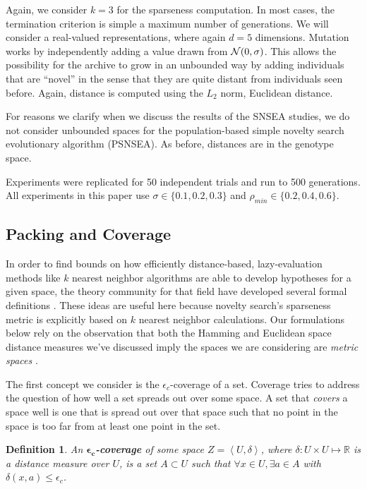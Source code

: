 \documentclass[twoside]{article}
\newtheorem{definition}{Definition}
\newcommand{\IR}{\mathbb{R}}
\begin{document}
Again, we consider $k=3$ for the sparseness computation.  In most cases, the termination criterion is simple a maximum number of generations.  We will consider a real-valued representations, where again $d=5$ dimensions.  Mutation works by independently adding a value drawn from ${\cal N}(0,\sigma)$.  This allows the possibility for the archive to grow in an unbounded way by adding individuals that are ``novel'' in the sense that they are quite distant from individuals seen before.  Again, distance is computed using the $L_2$ norm, Euclidean distance.

For reasons we clarify when we discuss the results of the SNSEA studies, we do not consider unbounded spaces for the population-based simple novelty search evolutionary algorithm (PSNSEA).  As before, distances are in the genotype space.

Experiments were replicated for 50 independent trials and run to 500 generations. All experiments in this paper use $\sigma\in\{0.1,0.2,0.3\}$ and $\rho_{min} \in \{0.2,0.4,0.6\}$. 


\subsection{Packing and Coverage}
\label{subsec:knn}

In order to find bounds on how efficiently distance-based, lazy-evaluation methods like $k$ nearest neighbor algorithms are able to develop hypotheses for a given space, the theory community for that field have developed several formal definitions \citep{Clarkson1999dcg}. These ideas are useful here because novelty search's sparseness metric is explicitly based on $k$ nearest neighbor calculations.  Our formulations below rely on the observation that both the Hamming and Euclidean space distance measures we've discussed imply the spaces we are considering are \emph{metric spaces} \citep{Bryant1985}.

The first concept we consider is the $\epsilon_c$-coverage of a set.  Coverage tries to address the question of how well a set spreads out over some space.  A set that \emph{covers} a space well is one that is spread out over that space such that no point in the space is too far from at least one point in the set.

\begin{definition}
An $\boldsymbol{\epsilon_c}$\textbf{-coverage} of some space $Z=\left\langle U, \delta\right\rangle$, where $\delta: U\times U \mapsto \IR$ is a distance measure over $U$, is a set $A \subset U$ such that $\forall x\in U, \exists a\in A$ with $\delta(x,a) \leq \epsilon_c$. 
\end{definition}
\end{document}
